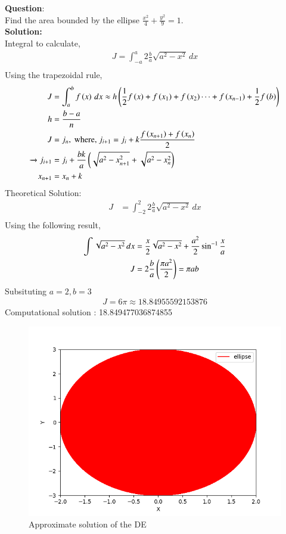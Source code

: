 \documentclass[journal]{IEEEtran}
\begin{document}
\textbf{Question}:\\
Find the area bounded by the ellipse $\frac{x^2}{4} + \frac{y^2}{9} = 1$.
\\
\textbf{Solution: }\\
Integral to calculate, 
\begin{align}
    J = \int_{-a}^{a}  2\frac{b}{a}\sqrt{a^2 - {x}^2} \, dx\\
\end{align}
Using the trapezoidal rule,
\begin{align}
    J &= \int_a^b f\left(x\right)\, dx \approx h\left(\frac{1}{2}f\left(x\right) + f\left(x_1\right) + f\left(x_2\right) \cdots + f\left(x_{n-1}\right) + \frac{1}{2}f\left(b\right)\right)\\
    h &= \frac{b-a}{n}\\
    J &= j_n, \text{ where, } j_{i + 1} = j_i + k\frac{f\left(x_{n+1}\right) + f\left(x_n\right)}{2}\\ 
    \xrightarrow{} j_{i + 1} &= j_i + \frac{bk}{a}\left(\sqrt{a^2 - x_{n+1}^2} + \sqrt{a^2 - x_n^2}\right)\\
    x_{n+1} &= x_n + k
\end{align}
Theoretical Solution:
\begin{align}
    J &= \int_{-2}^{2}  2\frac{b}{a}\sqrt{a^2 - {x}^2} \, dx\\
\end{align}
Using the following result, 
\begin{align}
    \int \sqrt{a^2 - x^2} \, dx &= \frac{x}{2} \sqrt{a^2 - x^2} + \frac{a^2}{2}\sin ^{-1} \frac{x}{a}\\ 
    J &= 2\frac{b}{a} \left(\frac{\pi a^2}{2}\right) = \pi ab
\end{align}
Subsituting $a = 2, b = 3$
\begin{align}
   J = 6\pi \approx 18.84955592153876
\end{align}
Computational solution : 18.849477036874855
\begin{figure}[h!]
   \centering
   \includegraphics[width=0.7\columnwidth]{figs/fig.png}
    \caption{Approximate solution of the DE}
\end{figure}
\end{document}
